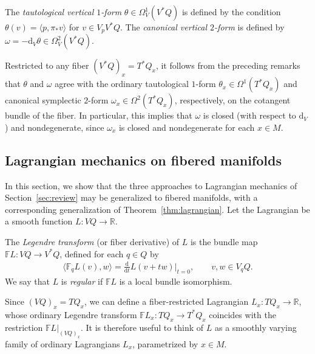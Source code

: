 \documentclass[10pt,a4paper]{amsart}
\numberwithin{equation}{section}
\begin{document}
\begin{Definition} The \emph{tautological vertical $1$-form} $ \theta \in \Omega ^1 _V ( V ^\ast Q ) $ is def\/ined by the condition $ \theta ( v ) = \langle p , \pi _\ast v \rangle $ for $ v \in V _p V ^\ast Q $. The \emph{canonical vertical $2$-form} is def\/ined by $ \omega = - \mathrm{d} _V \theta \in \Omega ^2 _V ( V ^\ast Q ) $.
\end{Definition}

\begin{Remark} Restricted to any f\/iber $ ( V ^\ast Q ) _x = T ^\ast Q _x $, it follows from the preceding remarks that $\theta$ and $\omega$ agree with the ordinary tautological $1$-form $\theta _x \in \Omega ^1 ( T ^\ast Q _x ) $ and canonical symplectic $2$-form $\omega _x \in \Omega ^2 ( T ^\ast Q _x ) $, respectively, on the cotangent bundle of the f\/iber. In particular, this implies that $ \omega $ is closed (with respect to $ \mathrm{d} _V $) and nondegenerate, since $ \omega _x $ is closed and nondegenerate for each $ x \in M $.
\end{Remark}

\subsection{Lagrangian mechanics on f\/ibered manifolds}

In this section, we show that the three approaches to Lagrangian mechanics of Section~\ref{sec:review} may be generalized to f\/ibered manifolds, with a corresponding generalization of Theorem~\ref{thm:lagrangian}. Let the Lagrangian be a smooth function $ L \colon V Q \rightarrow \mathbb{R} $.

\begin{Definition} The \emph{Legendre transform} (or f\/iber derivative) of $L$ is the bundle map $ \mathbb{F} L \colon V Q \rightarrow V ^\ast Q $,
 def\/ined for each $ q \in Q $ by
 \begin{gather*}
 \bigl\langle \mathbb{F} _q L (v) , w \bigr\rangle = \frac{\mathrm{d}}{\mathrm{d}t} L ( v + t w ) \Bigr\rvert _{ t = 0 }, \qquad v, w \in V _q Q .
 \end{gather*}
We say that $L$ is \emph{regular} if $ \mathbb{F} L $ is a local bundle isomorphism.
\end{Definition}

\begin{Remark} Since $ ( V Q ) _x = T Q _x $, we can def\/ine a f\/iber-restricted Lagrangian $ L _x \colon T Q _x \rightarrow \mathbb{R} $, whose ordinary Legendre transform $ \mathbb{F} L _x \colon T Q _x \rightarrow T ^\ast Q _x $ coincides with the restriction $ \mathbb{F} L \rvert _{ (V Q) _x } $. It is therefore useful to think of $L$ as a smoothly varying family of ordinary Lagrangians $ L _x $, parametrized by $ x \in M $.
\end{Remark}
\end{document}
